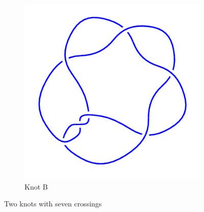 \documentclass[12pt,letterpaper]{article}
\begin{document}
\begin{figure}[h]
\begin{subfigure}{.45\textwidth}
        \includegraphics[width=\textwidth]{knotpics/7_3mirror.png}
        \caption{Knot B}
    \end{subfigure}
    \caption{Two knots with seven crossings}
\end{figure}
\end{document}
